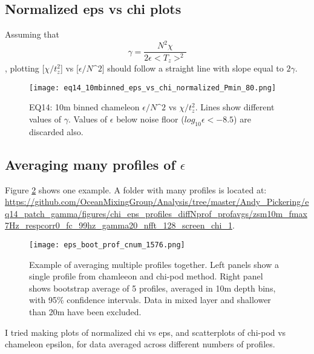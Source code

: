 \documentclass[11pt]{article}
\begin{document}
\clearpage
\subsection{Normalized eps vs chi plots}

Assuming that
\begin{equation}
\gamma=\frac{N^2 \chi}{2\epsilon<T_z>^2}
\end{equation}
, plotting [$\chi/t_{z}^{2}$] vs [$\epsilon/N\^2$] should follow a straight line with slope equal to $2\gamma$.


\begin{figure}[htbp]
\texttt{[image: eq14\_10mbinned\_eps\_vs\_chi\_normalized\_Pmin\_80.png]}
\caption{EQ14: 10m binned  chameleon $\epsilon/N\^2$ vs $\chi/t_{z}^{2}$. Lines show different values of $\gamma$. Values of $\epsilon$ below noise floor ($log_{10}\epsilon<-8.5$) are discarded also.}
\label{}
\end{figure}





\clearpage
\subsection{Averaging many profiles of $\epsilon$}

Figure \ref{prof_avg_ex} shows one example. A folder with many profiles is located at:
\url{https://github.com/OceanMixingGroup/Analysis/tree/master/Andy_Pickering/eq14_patch_gamma/figures/chi_eps_profiles_diffNprof_profavgs/zsm10m_fmax7Hz_respcorr0_fc_99hz_gamma20_nfft_128_screen_chi_1}. %

\begin{figure}[htbp]
\texttt{[image: eps\_boot\_prof\_cnum\_1576.png]}
\caption{Example of averaging multiple profiles together. Left panels show a single profile from chamleeon and chi-pod method. Right panel shows bootstrap average of 5 profiles, averaged in 10m depth bins, with 95\% confidence intervals. Data in mixed layer and shallower than 20m have been excluded.}
\label{prof_avg_ex}
\end{figure}



I tried making plots of normalized chi vs eps, and scatterplots of chi-pod vs chameleon epsilon, for data averaged across different numbers of profiles. 
\end{document}
